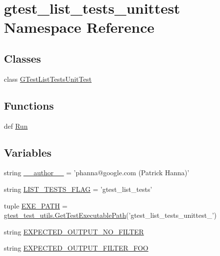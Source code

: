 \hypertarget{namespacegtest__list__tests__unittest}{\section{gtest\-\_\-list\-\_\-tests\-\_\-unittest \-Namespace \-Reference}
\label{d1/d4f/namespacegtest__list__tests__unittest}
}
\subsection*{\-Classes}
\begin{DoxyCompactItemize}
\item 
class \hyperlink{classgtest__list__tests__unittest_1_1GTestListTestsUnitTest}{\-G\-Test\-List\-Tests\-Unit\-Test}
\end{DoxyCompactItemize}
\subsection*{\-Functions}
\begin{DoxyCompactItemize}
\item 
def \hyperlink{namespacegtest__list__tests__unittest_ab19e9fbe5019dee351750f028273c741}{\-Run}
\end{DoxyCompactItemize}
\subsection*{\-Variables}
\begin{DoxyCompactItemize}
\item 
string \hyperlink{namespacegtest__list__tests__unittest_a629d61dfe4da763164a4d1a2d85b0afd}{\-\_\-\-\_\-author\-\_\-\-\_\-} = 'phanna@google.\-com (\-Patrick \-Hanna)'
\item 
string \hyperlink{namespacegtest__list__tests__unittest_a6bd797257f4db78c152b6e62341177db}{\-L\-I\-S\-T\-\_\-\-T\-E\-S\-T\-S\-\_\-\-F\-L\-A\-G} = 'gtest\-\_\-list\-\_\-tests'
\item 
tuple \hyperlink{namespacegtest__list__tests__unittest_a216df3f485400b109390103528720888}{\-E\-X\-E\-\_\-\-P\-A\-T\-H} = \hyperlink{namespacegtest__test__utils_a1bdf3cac86afa675ed37629b183048e9}{gtest\-\_\-test\-\_\-utils.\-Get\-Test\-Executable\-Path}('gtest\-\_\-list\-\_\-tests\-\_\-unittest\-\_\-')
\item 
string \hyperlink{namespacegtest__list__tests__unittest_a19fc0aef12493607223baffd69f18b1b}{\-E\-X\-P\-E\-C\-T\-E\-D\-\_\-\-O\-U\-T\-P\-U\-T\-\_\-\-N\-O\-\_\-\-F\-I\-L\-T\-E\-R}
\item 
string \hyperlink{namespacegtest__list__tests__unittest_acba2fd0c011344c01b030fb60138b990}{\-E\-X\-P\-E\-C\-T\-E\-D\-\_\-\-O\-U\-T\-P\-U\-T\-\_\-\-F\-I\-L\-T\-E\-R\-\_\-\-F\-O\-O}
\end{DoxyCompactItemize}


